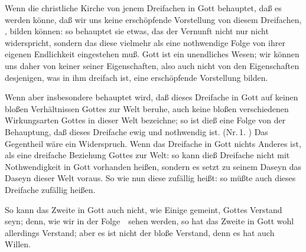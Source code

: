 \begin{aufza}
\item Wenn die christliche Kirche von jenem Dreifachen in Gott behauptet, daß es  werden könne, daß wir uns keine erschöpfende Vorstellung von diesem Dreifachen, , bilden können: so behauptet sie etwas, das der Vernunft nicht nur nicht widerspricht, sondern das diese vielmehr als eine nothwendige Folge von ihrer eigenen Endlichkeit eingestehen muß. Gott ist ein unendliches Wesen; wir können uns daher von keiner seiner Eigenschaften, also auch nicht von den Eigenschaften desjenigen, was in ihm dreifach ist, eine erschöpfende Vorstellung bilden.
\item Wenn aber insbesondere behauptet wird, daß dieses Dreifache in Gott auf keinen bloßen Verhältnissen Gottes zur Welt beruhe, auch keine bloßen verschiedenen Wirkungsarten Gottes in dieser Welt bezeichne; so ist dieß eine Folge von der Behauptung, daß dieses Dreifache ewig und nothwendig ist. (Nr.\,1. ) Das Gegentheil wäre ein Widerspruch. Wenn das Dreifache in Gott nichts Anderes ist, als eine dreifache Beziehung Gottes zur Welt: so kann dieß Dreifache nicht mit Nothwendigkeit in Gott vorhanden heißen, sondern es setzt zu seinem Daseyn das Daseyn dieser Welt voraus. So wie nun diese zufällig heißt: so müßte auch dieses Dreifache zufällig heißen.
\item So kann das Zweite in Gott auch nicht, wie Einige gemeint, Gottes Verstand seyn; denn, wie wir in der Folge~\ sehen werden, so hat das Zweite in Gott wohl allerdings Verstand; aber es ist nicht der bloße Verstand, denn es hat auch Willen.
\end{aufza}


